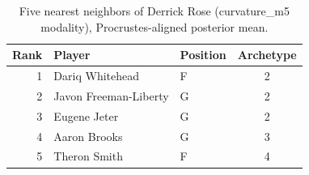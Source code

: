 \begin{table}[htbp]
  \centering\small
  \begin{tabular}{rllc}
    \toprule
    Rank & Player & Position & Archetype \\
    \midrule
    1 & Dariq Whitehead & F & 2 \\
    2 & Javon Freeman-Liberty & G & 2 \\
    3 & Eugene Jeter & G & 2 \\
    4 & Aaron Brooks & G & 3 \\
    5 & Theron Smith & F & 4 \\
    \bottomrule
  \end{tabular}
  \caption{Five nearest neighbors of Derrick Rose (curvature_m5 modality), Procrustes-aligned posterior mean.}
  \label{tab:Derrick_Rose_neighbors_curvature_m5}
\end{table}

